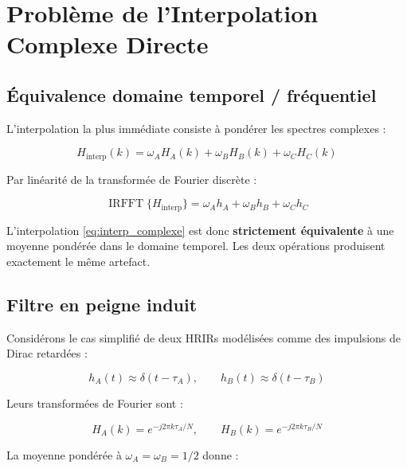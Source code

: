 \documentclass[12pt, a4paper]{article}
\theoremstyle{definition}
\DeclareMathOperator{\irfft}{IRFFT}
\begin{document}
\section{Problème de l'Interpolation Complexe Directe}

\subsection{Équivalence domaine temporel / fréquentiel}

L'interpolation la plus immédiate consiste à pondérer les spectres complexes :

\begin{equation}
  H_{\text{interp}}(k) = \omega_A H_A(k) + \omega_B H_B(k) + \omega_C H_C(k)
  \label{eq:interp_complexe}
\end{equation}

Par linéarité de la transformée de Fourier discrète :

\begin{equation}
  \irfft\{H_{\text{interp}}\} = \omega_A h_A + \omega_B h_B + \omega_C h_C
\end{equation}

L'interpolation \eqref{eq:interp_complexe} est donc \textbf{strictement équivalente}
à une moyenne pondérée dans le domaine temporel. Les deux opérations produisent
exactement le même artefact.

\subsection{Filtre en peigne induit}

Considérons le cas simplifié de deux HRIRs modélisées comme des impulsions
de Dirac retardées :

\begin{equation}
  h_A(t) \approx \delta(t - \tau_A), \qquad h_B(t) \approx \delta(t - \tau_B)
\end{equation}

Leurs transformées de Fourier sont :

\begin{equation}
  H_A(k) = e^{-j 2\pi k \tau_A / N}, \qquad H_B(k) = e^{-j 2\pi k \tau_B / N}
\end{equation}

La moyenne pondérée à $\omega_A = \omega_B = 1/2$ donne :
\end{document}
